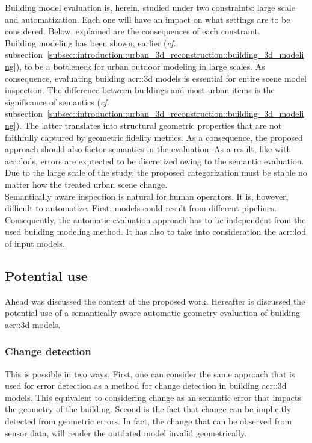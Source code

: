         Building model evaluation is, herein, studied under two constraints: large scale and automatization.
        Each one will have an impact on what settings are to be considered.
        Below, explained are the consequences of each constraint.\\

        Building modeling has been shown, earlier (\textit{cf.} subsection~\ref{subsec::introduction::urban_3d_reconstruction::building_3d_modeling}), to be a bottleneck for urban outdoor modeling in large scales.
        As consequence, evaluating building \gls{acr::3d} models is essential for entire scene model inspection.
        The difference between buildings and most urban items is the significance of semantics (\textit{cf.} subsection~\ref{subsec::introduction::urban_3d_reconstruction::building_3d_modeling}).
        The latter translates into structural geometric properties that are not faithfully captured by geometric fidelity metrics.
        As a consequence, the proposed approach should also factor semantics in the evaluation.
        As a result, like with \glspl{acr::lod}, errors are exptected to be discretized owing to the semantic evaluation.
        Due to the large scale of the study, the proposed categorization must be stable no matter how the treated urban scene change.\\

        Semantically aware inspection is natural for human operators.
        It is, however, difficult to automatize.
        First, models could result from different pipelines.
        Consequently, the automatic evaluation approach has to be independent from the used building modeling method.
        It has also to take into consideration the \gls{acr::lod} of input models.

    \subsection{Potential use}
        \label{sec::introduction::contributions::use}
        Ahead was discussed the context of the proposed work.
        Hereafter is discussed the potential use of a semantically aware automatic geometry evaluation of building \gls{acr::3d} models.
        \subsubsection{Change detection}
            This is possible in two ways.
            First, one can consider the same approach that is used for error detection as a method for change detection in building \gls{acr::3d} models.
            This equivalent to considering change as an semantic error that impacts the geometry of the building.
            Second is the fact that change can be implicitly detected from geometric errors.
            In fact, the change that can be observed from sensor data, will render the outdated model invalid geometrically.


